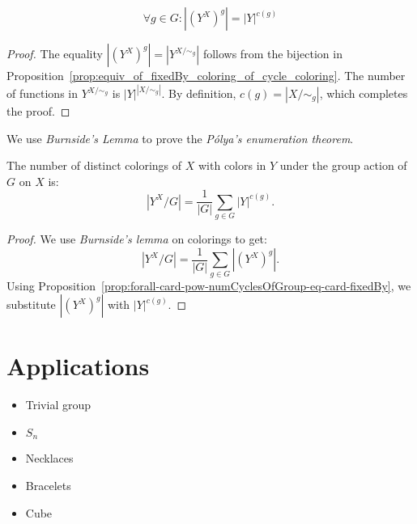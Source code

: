 \begin{proposition}
  \label{prop:forall-card-pow-numCyclesOfGroup-eq-card-fixedBy}
  \leanok
  \begin{equation*}
    \forall g \in G: |(Y^X)^g| = |Y|^{c(g)}
  \end{equation*}
\end{proposition}

\begin{proof}
  \leanok
  The equality $|(Y^X)^g| = |Y^{X/\sim_g}|$ follows from the bijection in Proposition~\ref{prop:equiv_of_fixedBy_coloring_of_cycle_coloring}. The number of functions in $Y^{X/\sim_g}$ is $|Y|^{|X/\sim_g|}$. By definition, $c(g) = |X/\sim_g|$, which completes the proof.
\end{proof}

We use \emph{Burnside's Lemma} to prove the \emph{Pólya's enumeration theorem}.

\begin{proposition}
  \label{prop:numDistinctColorings-eq-sum-card-pow-numCyclesOfGroup-div-mul-card-group}
  \leanok
  The number of distinct colorings of $X$ with colors in $Y$ under the group action of $G$ on $X$ is:
  \begin{equation*}
    |Y^X/G| = \frac{1}{|G|} \sum_{g \in G} |Y|^{c(g)}.
  \end{equation*}
\end{proposition}

\begin{proof}
  \leanok
  We use \emph{Burnside's lemma} on colorings to get:
  \begin{equation*}
    |Y^X/G| = \frac{1}{|G|} \sum_{g \in G} |(Y^X)^g|.
  \end{equation*}
  Using Proposition~\ref{prop:forall-card-pow-numCyclesOfGroup-eq-card-fixedBy}, we substitute $|(Y^X)^g|$ with $|Y|^{c(g)}$.
\end{proof}

\section{Applications}

\begin{itemize}
  \item Trivial group
  
  \item $S_n$
  
  \item Necklaces
  
  \item Bracelets
  
  \item Cube
\end{itemize}
